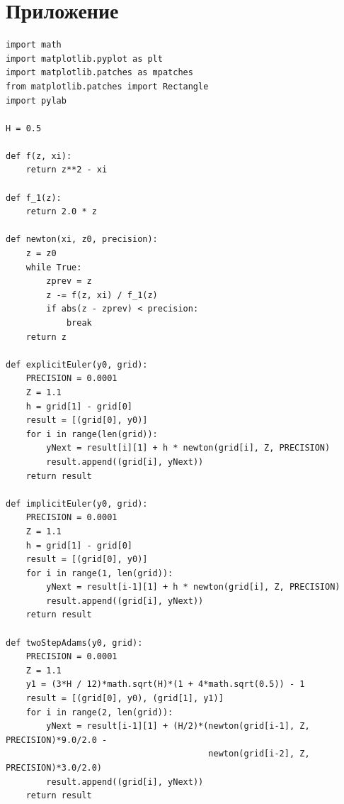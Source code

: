 \documentclass[12pt,a4paper]{article}
\begin{document}
    \section*{Приложение}
        \begin{lstlisting}
import math
import matplotlib.pyplot as plt
import matplotlib.patches as mpatches
from matplotlib.patches import Rectangle
import pylab

H = 0.5

def f(z, xi):
    return z**2 - xi
    
def f_1(z):
    return 2.0 * z

def newton(xi, z0, precision):
    z = z0
    while True:
        zprev = z
        z -= f(z, xi) / f_1(z)
        if abs(z - zprev) < precision:
            break
    return z

def explicitEuler(y0, grid):
    PRECISION = 0.0001
    Z = 1.1
    h = grid[1] - grid[0]
    result = [(grid[0], y0)]
    for i in range(len(grid)):
        yNext = result[i][1] + h * newton(grid[i], Z, PRECISION)
        result.append((grid[i], yNext))
    return result

def implicitEuler(y0, grid):
    PRECISION = 0.0001
    Z = 1.1
    h = grid[1] - grid[0]
    result = [(grid[0], y0)]
    for i in range(1, len(grid)):
        yNext = result[i-1][1] + h * newton(grid[i], Z, PRECISION)
        result.append((grid[i], yNext))
    return result

def twoStepAdams(y0, grid):
    PRECISION = 0.0001
    Z = 1.1
    y1 = (3*H / 12)*math.sqrt(H)*(1 + 4*math.sqrt(0.5)) - 1
    result = [(grid[0], y0), (grid[1], y1)]
    for i in range(2, len(grid)):
        yNext = result[i-1][1] + (H/2)*(newton(grid[i-1], Z, PRECISION)*9.0/2.0 -
                                        newton(grid[i-2], Z, PRECISION)*3.0/2.0)
        result.append((grid[i], yNext))
    return result
        \end{lstlisting}
        
        
\end{document}
